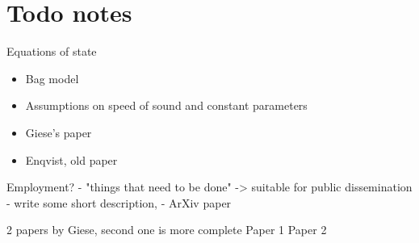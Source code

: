 \iffalse
\section{Todo notes}

Equations of state
\begin{itemize}
    \item Bag model \cite[eq. 7.33]{lecture_notes}
    \item Assumptions on speed of sound and constant parameters
    \item Giese's paper \cite{giese_2020}
    \item Enqvist, old paper \cite{enqvist_nucleation_1992}
\end{itemize}

Employment?
- "things that need to be done"
-> suitable for public dissemination
- write some short description,
    - ArXiv paper

2 papers by Giese, second one is more complete
Paper 1 \cite{giese_2020}
Paper 2 \cite{giese_2021}


